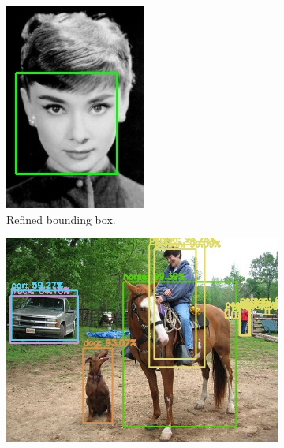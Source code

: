 \begin{figure}[!h]
\begin{subfigure}{.13\linewidth}
		\includegraphics[width=1\linewidth]{images/detection/img1_withNMS}
		\caption{Refined bounding box.}
		\label{fig:sub_withNMS}
	\end{subfigure}
	\begin{subfigure}{.35\linewidth}
		\includegraphics[width=1\linewidth]{images/detection/ex2_yolo_noNMS}

\end{subfigure}
\end{figure}
